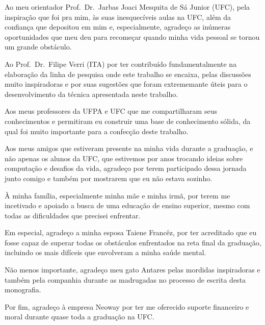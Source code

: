Ao meu orientador Prof.\ Dr.\ Jarbas Joaci Mesquita de Sá Junior
(UFC), pela inspiração que foi pra mim, às suas inesquecíveis aulas na
UFC, além da confiança que depositou em mim e, especialmente, agradeço
as inúmeras oportunidades que meu deu para recomeçar quando minha vida
pessoal se tornou um grande obstáculo.

Ao Prof.\ Dr.\ Filipe Verri (ITA) por ter contribuído fundamentalmente
na elaboração da linha de pesquisa onde este trabalho se encaixa,
pelas discussões muito inspiradoras e por suas sugestões que foram
extrememante úteis para o desenvolvimento da técnica apresentada neste
trabalho.

Aos meus professores da UFPA e UFC que me compartilharam seus
conhecimentos e permitiram eu construir uma base de conhecimento
sólida, da qual foi muito importante para a confecção deste trabalho.

Aos meus amigos que estiveram presente na minha vida durante a
graduação, e não apenas os alunos da UFC, que estivemos por anos
trocando ideias sobre computação e desafios da vida, agradeço por
terem participado dessa jornada junto comigo e também por mostrarem
que eu não estava sozinho.

À minha família, especialmente minha mãe e minha irmã, por terem me
incetivado e apoiado a busca de uma educação de ensino superior, mesmo
com todas as dificuldades que precisei enfrentar.

Em especial, agradeço a minha esposa Taiene Francêz, por ter
acreditado que eu fosse capaz de superar todas os obstáculos
enfrentados na reta final da graduação, incluindo os mais difíceis que
envolveram a minha saúde mental.

Não menos importante, agradeço meu gato Antares pelas mordidas
inspiradoras e também pela companhia durante as madrugadas no processo
de escrita desta monografia.

Por fim, agradeço à empresa Neoway por ter me oferecido suporte financeiro e moral
durante quase toda a graduação na UFC.\@
